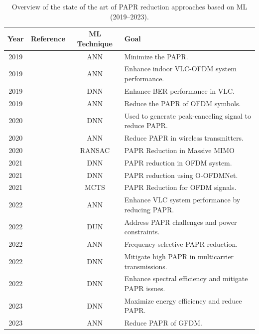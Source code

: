 \documentclass[conference]{IEEEtran}
\begin{document}
\begin{table}[t]
\caption{Overview of the state of the art of PAPR reduction approaches based on ML (2019--2023).}
\begin{center}
\begin{tabular}{|c|c|c|p{8cm}|}
\hline
\textbf{Year} & \textbf{Reference} & \textbf{ML Technique} & \textbf{Goal} \\
\hline
2019 & \cite{b141} & ANN & Minimize the PAPR. \\
\hline
2019 & \cite{b143} & ANN & Enhance indoor VLC-OFDM system performance. \\
\hline
2019 & \cite{b147} & DNN & Enhance BER performance in VLC. \\
\hline
2019 & \cite{b142} & ANN & Reduce the PAPR of OFDM symbols. \\
\hline
2020 & \cite{b148} & DNN & Used to generate peak-canceling signal to reduce PAPR. \\
\hline
2020 & \cite{b145} & ANN & Reduce PAPR in wireless transmitters. \\
\hline
2020 & \cite{b134} & RANSAC & PAPR Reduction in Massive MIMO \\
\hline
2021 & \cite{b149} & DNN & PAPR reduction in OFDM system. \\
\hline
2021 & \cite{b151} & DNN & PAPR reduction using O-OFDMNet. \\
\hline
2021 & \cite{b155} & MCTS & PAPR Reduction for OFDM signals. \\
\hline
2022 & \cite{b146} & ANN & Enhance VLC system performance by reducing PAPR. \\
\hline
2022 & \cite{b152} & DUN & Address PAPR challenges and power constraints. \\
\hline
2022 & \cite{b135} & ANN & Frequency-selective PAPR reduction. \\
\hline
2022 & \cite{b153} & DNN & Mitigate high PAPR in multicarrier transmissions. \\
\hline
2022 & \cite{b154} & DNN & Enhance spectral efficiency and mitigate PAPR issues. \\
\hline
2023 & \cite{b150} & DNN & Maximize energy efficiency and reduce PAPR. \\
\hline
2023 & \cite{b144} & ANN & Reduce PAPR of GFDM. \\
\hline
\end{tabular}
\label{tab3}
\end{center}
\end{table}
\end{document}
